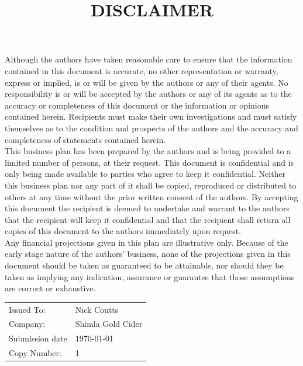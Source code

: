\documentclass[11pt]{article}
\begin{document}
\title{DISCLAIMER}
\maketitle

Although the authors have taken reasonable care to ensure that the information
contained in this document is accurate, no other representation or warranty,
express or implied, is or will be given by the authors or any of their agents.
No responsibility is or will be accepted by the authors or any of its agents as
to the accuracy or completeness of this document or the information or opinions
contained herein. Recipients must make their own investigations and must satisfy
themselves as to the condition and prospects of the authors and the accuracy
and completeness of statements contained herein. \\
This business plan has been prepared by the authors and is being provided to a 
limited number of persons, at their request. This document is confidential and
is only being made available to parties who agree to keep it confidential.
Neither this business plan nor any part of it shall be copied, reproduced or
distributed to others at any time without the prior written consent of the
authors. By accepting this document the recipient is deemed to undertake and
warrant to the authors that the recipient will keep it confidential and that the
recipient shall return all copies of this document to the authors immediately
upon request. \\
Any financial projections given in this plan are illustrative only. Because of
the early stage nature of the authors' business, none of the projections given
in this document should be taken as guaranteed to be attainable, nor should they
be taken as implying any indication, assurance or guarantee that those
assumptions are correct or exhaustive.

\vfill

\begin{table}[H]
\begin{center}
\begin{tabular}{| l l |}
\hline
Issued To:      &  Nick Coutts        \\
Company:        &  Shimla Gold Cider  \\
Submission date &  \today             \\
Copy Number:    &  1                  \\
\hline
\end{tabular}
\end{center}
\end{table}
\end{document}
